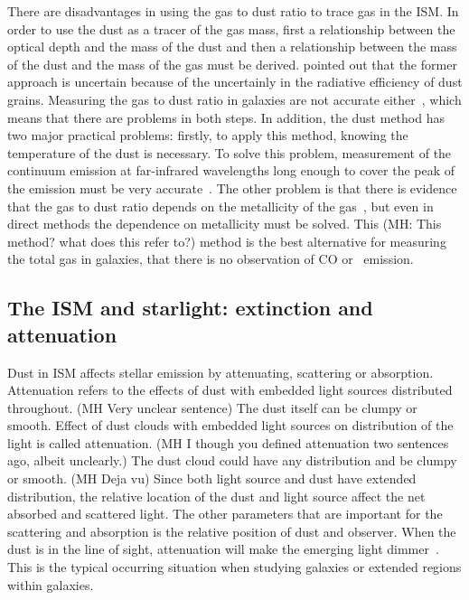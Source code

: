There are disadvantages in using the gas to dust ratio to trace gas in the ISM.
In order to use the dust as a tracer of the gas mass, first a relationship between the optical depth and the mass of the dust and then a relationship between the mass of the dust and the mass of the gas must be derived.
\cite{Draine03} pointed out that the former approach is uncertain because of the uncertainly in the radiative efficiency of dust grains. 
Measuring the gas to dust ratio in galaxies are not accurate either~\citep{Hildebran83}, which means that there are problems in both steps. 
In addition, the dust method has two major practical problems: firstly, to apply this method, knowing the temperature of the dust is necessary. 
To solve this problem, measurement of the continuum emission at far-infrared wavelengths long enough to cover the peak of the emission must be very accurate~\citep{Ealas12}. 
The other problem is that there is evidence that the gas to dust ratio depends on the metallicity of the gas~\citep{Lisenfeld98, Draine07}, but even in direct methods the dependence on metallicity must be solved. 
This (MH: This method? what does this refer to?) method is the best alternative for measuring the total gas in galaxies, that there is no observation of CO or \hi~emission. 

\subsection{The ISM and starlight: extinction and attenuation}
\label{sec: extinction}
Dust in ISM affects stellar emission by attenuating, scattering or absorption.
Attenuation refers to the effects of dust with embedded light sources distributed throughout. (MH Very unclear sentence)
The dust itself can be clumpy or smooth. 
Effect of dust clouds with embedded light sources on distribution of the light is called attenuation. (MH I though you defined attenuation two sentences ago, albeit unclearly.)
The dust cloud could have any distribution and be clumpy or smooth. (MH Deja vu)
Since both light source and dust have extended distribution, the relative location of the dust and light source affect the net absorbed and scattered light.
The other parameters that are important for the scattering and absorption is the relative position of dust and observer.
When the dust is in the line of sight, attenuation will make the emerging light dimmer~\citep[e.g.][and references therein]{Calzetti13}.
This is the typical occurring situation when studying galaxies or extended regions within galaxies.

